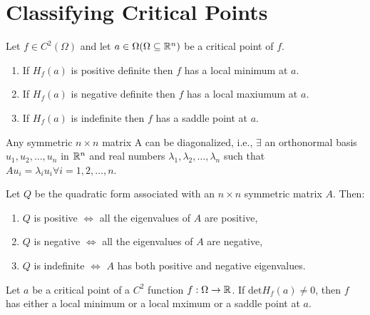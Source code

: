 \chapter{Classifying Critical Points}


\begin{theorem}
    Let $f \in C^2(\Omega)$ and let $a \in \Omega (\Omega \subseteq \mathbb{R}^n)$ be a critical point of $f$.
    \begin{enumerate}
        \item If $H_f(a)$ is positive definite then $f$ has a local minimum at $a$.
        \item If $H_f(a)$ is negative definite then $f$ has a local maxiumum at $a$.
        \item If $H_f(a)$ is indefinite then $f$ has a saddle point at $a$.
    \end{enumerate}
\end{theorem}

\begin{recall}
    Any symmetric $n \times n$ matrix A can be diagonalized, i.e., $\exists$ an orthonormal basis $u_1, u_2, \dots, u_n$ in $\mathbb{R}^n$ and real numbers $\lambda_1, \lambda_2, \dots, \lambda_n$ such that $A u_i = \lambda_i u_i \forall i = 1, 2, \dots, n$.
\end{recall}

\begin{proposition}
    Let $Q$ be the quadratic form associated with an $n \times n$ symmetric matrix $A$. Then:
    \begin{enumerate}
        \item $Q$ is positive $\iff$ all the eigenvalues of $A$ are positive,
        \item $Q$ is negative $\iff$ all the eigenvalues of $A$ are negative,
        \item $Q$ is indefinite $\iff$ $A$ has both positive and negative eigenvalues.
    \end{enumerate}
\end{proposition}

\begin{corollary}
    Let $a$ be a critical point of a $C^2$ function $f: \Omega \to \mathbb{R}$. If $\mathrm{det} H_f(a) \neq 0$, then $f$ has either a local minimum or a local mximum or a saddle point at $a$.
\end{corollary}

